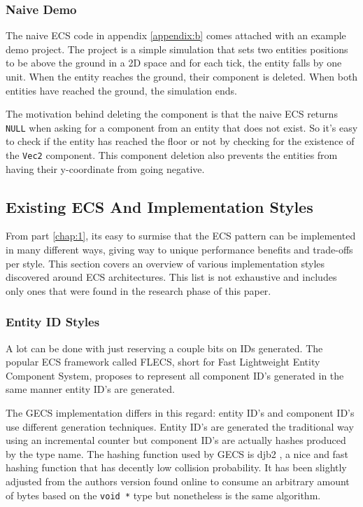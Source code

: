 \subsubsection{Naive Demo}
The naive ECS code in appendix \ref{appendix:b} comes attached with an example demo project. The project is a simple simulation that sets two entities positions to be above the ground in a 2D space and for each tick, the entity falls by one unit. When the entity reaches the ground, their component is deleted. When both entities have reached the ground, the simulation ends. 

The motivation behind deleting the component is that the naive ECS returns \texttt{NULL} when asking for a component from an entity that does not exist. So it's easy to check if the entity has reached the floor or not by checking for the existence of the \texttt{Vec2} component. This component deletion also prevents the entities from having their y-coordinate from going negative.

\subsection{Existing ECS And Implementation Styles}
From part \ref{chap:1}, its easy to surmise that the ECS pattern can be implemented in many different ways, giving way to unique performance benefits and trade-offs per style. This section covers an overview of various implementation styles discovered around ECS architectures. This list is not exhaustive and includes only ones that were found in the research phase of this paper. 

\subsubsection{Entity ID Styles}
A lot can be done with just reserving a couple bits on IDs generated. The popular ECS framework called FLECS, short for Fast Lightweight Entity Component System, proposes to represent all component ID's generated in the same manner entity ID's are generated. 

The GECS implementation differs in this regard: entity ID's and component ID's use different generation techniques. Entity ID's are generated the traditional way using an incremental counter but component ID's are actually hashes produced by the type name. The hashing function used by GECS is djb2 \cite{hashing}, a nice and fast hashing function that has decently low collision probability. It has been slightly adjusted from the authors version found online to consume an arbitrary amount of bytes based on the \texttt{void *} type but nonetheless is the same algorithm. 

